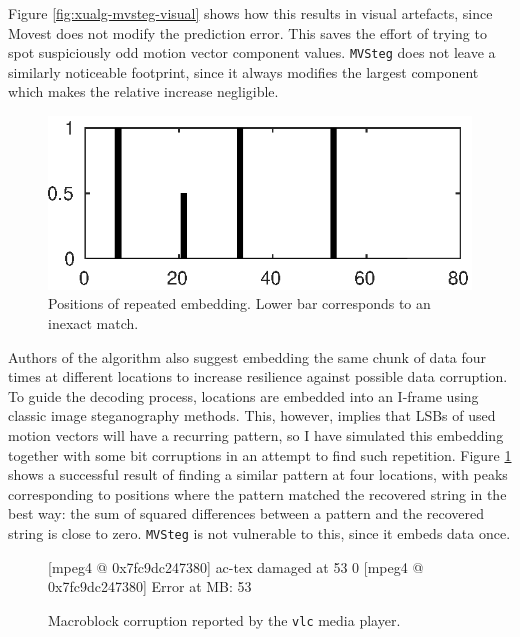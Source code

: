 \documentclass[12pt,british,twoside,notitlepage,usenames,dvipsnames,hypens,final]{report}
\numberwithin{equation}{section}
\numberwithin{figure}{section}
\renewenvironment{alltt}{\vspace{-0.6\baselineskip}\begin{oldalltt}}{\end{oldalltt}\vspace{-0.1\baselineskip}}
\begin{document}
Figure \ref{fig:xualg-mvsteg-visual} shows how this results in visual artefacts, since Movest does not modify the prediction error. This saves the effort of trying to spot suspiciously odd motion vector component values. \texttt{MVSteg} does not leave a similarly noticeable footprint, since it always modifies the largest component which makes the relative increase negligible.

\begin{figure}
\vspace{-15pt}
\centering
\includegraphics[scale=0.75]{img/4xembed.eps}
\caption{Positions of repeated embedding. Lower bar corresponds to an inexact match.}
\label{fig:4xembed}
\end{figure}

Authors of the algorithm also suggest embedding the same chunk of data four times at different locations to increase resilience against possible data corruption. To guide the decoding process, locations are embedded into an I-frame using classic image steganography methods. This, however, implies that LSBs of used motion vectors will have a recurring pattern, so I have simulated this embedding together with some bit corruptions in an attempt to find such repetition. Figure \ref{fig:4xembed} shows a successful result of finding a similar pattern at four locations, with peaks corresponding to positions where the pattern matched the recovered string in the best way: the sum of squared differences between a pattern and the recovered string is close to zero. \texttt{MVSteg} is not vulnerable to this, since it embeds data once.

\begin{figure}
\begingroup
    \fontsize{10pt}{12pt}\selectfont
\centering
\begin{alltt}
{\color{blue}[mpeg4 @ 0x7fc9dc247380]} {\color{red}ac-tex damaged at 53 0}
{\color{blue}[mpeg4 @ 0x7fc9dc247380]} {\color{red}Error at MB: 53}
\end{alltt}
\endgroup
\caption{Macroblock corruption reported by the \texttt{vlc} media player.}
\label{fig:vlc-corruption}
\end{figure}
\end{document}
